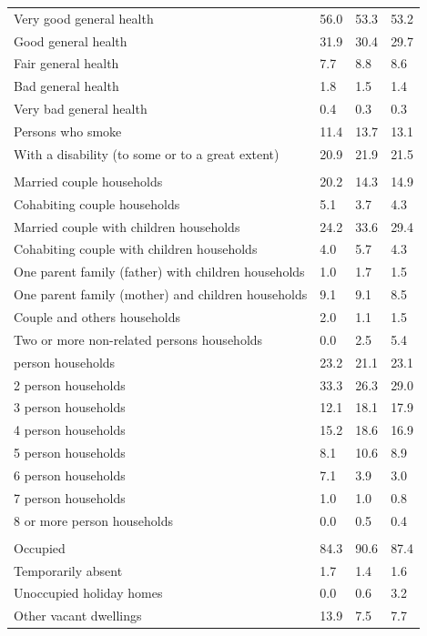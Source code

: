 \documentclass{article}
\begin{document}
\begin{table}[h]
\begin{tabular}{KTTT}
Very good general health & 56.0& 53.3& 53.2\\
Good general health & 31.9& 30.4& 29.7\\
Fair general health & 7.7& 8.8& 8.6\\
Bad general health & 1.8& 1.5& 1.4\\
Very bad general health & 0.4& 0.3& 0.3\\
    \hline
Persons who smoke & 11.4& 13.7& 13.1\\
    \hline
With a disability (to some or to a great extent) & 20.9& 21.9& 21.5\\
\hline
    \\ 
    \hline
Married couple households & 20.2& 14.3& 14.9\\
Cohabiting couple households & 5.1& 3.7& 4.3\\
Married couple with children households & 24.2& 33.6& 29.4\\
Cohabiting couple with children households & 4.0& 5.7& 4.3\\
One parent family (father) with  children households & 1.0& 1.7& 1.5\\
One parent family (mother) and children households & 9.1& 9.1& 8.5\\
Couple and others households  & 2.0& 1.1& 1.5\\
Two or more non-related persons households & 0.0& 2.5& 5.4\\
     person households & 23.2& 21.1& 23.1\\
2 person households & 33.3& 26.3& 29.0\\
3 person households & 12.1& 18.1& 17.9\\
4 person households & 15.2& 18.6& 16.9\\
5 person households &  8.1& 10.6&  8.9\\
6 person households & 7.1& 3.9& 3.0\\
7 person households & 1.0& 1.0& 0.8\\
8 or more person households & 0.0& 0.5& 0.4\\
\hline
    \\ 
    \hline
Occupied & 84.3& 90.6& 87.4\\
Temporarily absent & 1.7& 1.4& 1.6\\
Unoccupied holiday homes & 0.0& 0.6& 3.2\\
Other vacant dwellings & 13.9&  7.5&  7.7\\
\hline
\end{tabular}
\end{table}
\end{document}
